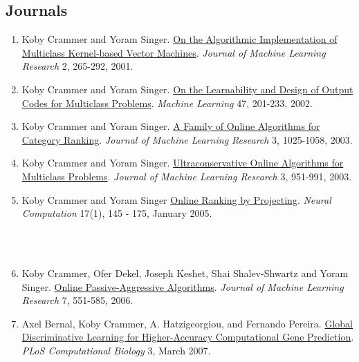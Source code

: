 \documentclass{resume}
\newcommand{\nolineskips}{
\setlength{\parskip}{1pt}
\setlength{\parsep}{1pt}
\setlength{\topsep}{1pt}
\setlength{\partopsep}{1pt}
\setlength{\itemsep}{1pt}}
\newcommand{\upenn}{~Position at UPENN~}
\begin{document}
\subsection*{Journals}
\begin{enumerate}
\nolineskips

\item
{Koby Crammer} and Yoram Singer.
\href{http://www.ai.mit.edu/projects/jmlr/papers/v2/crammer01a.html}
{On the Algorithmic Implementation of Multiclass Kernel-based Vector Machines}.
{\em Journal of Machine Learning Research} 2, 265-292, 2001.

\item
{Koby Crammer} and Yoram Singer.
\href{http://www.cis.upenn.edu/~crammer/publications/ecoc-mlj02.pdf}
{On the Learnability and Design of Output Codes for Multiclass Problems}.
{\em Machine Learning} 47, 201-233, 2002.

\item
{Koby Crammer} and Yoram Singer.
\href{http://www.ai.mit.edu/projects/jmlr/papers/v3/crammer03b.html}
{A Family of Online Algorithms for Category Ranking}.
 {\em Journal of Machine Learning Research} 3, 1025-1058, 2003.

\item
{Koby Crammer} and Yoram Singer.
\href{http://www.ai.mit.edu/projects/jmlr/papers/v3/crammer03a.html}
{Ultraconservative Online Algorithms for Multiclass Problems}.
 {\em Journal of Machine Learning Research} 3, 951-991, 2003.

\item
{Koby Crammer} and Yoram Singer
\href{http://www.mitpressjournals.org/doi/pdf/10.1162/0899766052530848}
{Online Ranking by Projecting}.
{\em Neural Computation} 17(1), 145 - 175, January 2005.
\\~\\\centerline{\hrulefill\raisebox{-0.5\ht2}{\upenn}\hrulefill}\\

\item
{Koby Crammer}, Ofer Dekel, Joseph Keshet, Shai Shalev-Shwartz and Yoram Singer.
\href{http://jmlr.csail.mit.edu/papers/v7/crammer06a.html}
{Online Passive-Aggressive Algorithms}.
 {\em Journal of Machine Learning Research} 7, 551-585, 2006.



\item
Axel Bernal, {Koby Crammer}, A. Hatzigeorgiou, and Fernando Pereira.
\href{http://compbiol.plosjournals.org/perlserv/?request=get-document&doi=10.1371/journal.pcbi.0030054}
{Global Discriminative Learning for Higher-Accuracy Computational Gene Prediction}.
{\em PLoS Computational Biology} 3, March 2007.


\end{enumerate}
\end{document}
